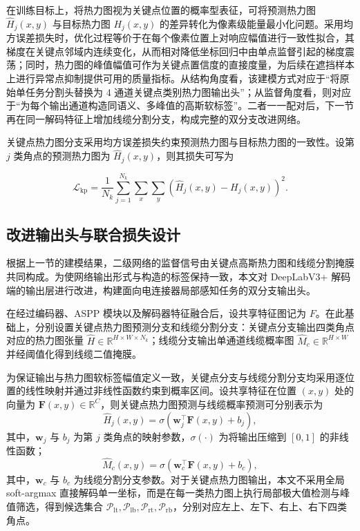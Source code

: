 在训练目标上，将热力图视为关键点位置的概率型表征，可将预测热力图 \(\hat{H}_j(x,y)\) 与目标热力图 \(H_j(x,y)\) 的差异转化为像素级能量最小化问题。采用均方误差损失时，优化过程等价于在每个像素位置上对响应幅值进行一致性拟合，其梯度在关键点邻域内连续变化，从而相对降低坐标回归中由单点监督引起的梯度震荡；同时，热力图的峰值幅值可作为关键点置信度的直接度量，为后续在遮挡样本上进行异常点抑制提供可用的质量指标。从结构角度看，该建模方式对应于“将原始单任务分割头替换为 4 通道关键点类别热力图输出头”；从监督角度看，则对应于“为每个输出通道构造同语义、多峰值的高斯软标签”。二者一一配对后，下一节再在同一解码特征上增加线缆分割分支，构成完整的双分支改进网络。

关键点热力图分支采用均方误差损失约束预测热力图与目标热力图的一致性。设第 \(j\) 类角点的预测热力图为 \(\hat{H}_j(x,y)\)，则其损失可写为

$$
\mathcal{L}_{\mathrm{kp}}=\frac{1}{N_k}\sum_{j=1}^{N_k}\sum_{x}\sum_{y}\left(\hat{H}_j(x,y)-H_j(x,y)\right)^2.
$$

\subsection{改进输出头与联合损失设计}
根据上一节的建模结果，二级网络的监督信号由关键点高斯热力图和线缆分割掩膜共同构成。为使网络输出形式与构造的标签保持一致，本文对 DeepLabV3+ 解码端的输出层进行改进，构建面向电连接器局部感知任务的双分支输出头。

在经过编码器、ASPP 模块以及解码器特征融合后，设共享特征图记为 \(F\)。在此基础上，分别设置关键点热力图预测分支和线缆分割分支：关键点分支输出四类角点对应的热力图张量 \(\hat{H}\in\mathbb{R}^{H\times W\times N_k}\)；线缆分支输出单通道线缆概率图 \(\hat{M}_{c}\in\mathbb{R}^{H\times W}\) 并经阈值化得到线缆二值掩膜。

为保证输出与热力图软标签幅值定义一致，关键点分支与线缆分割分支均采用逐位置的线性映射并通过非线性函数约束到概率区间。设共享特征在位置 \((x,y)\) 处的向量为 \(\mathbf{F}(x,y)\in\mathbb{R}^{C}\)，则关键点热力图预测与线缆概率预测可分别表示为
$$
\hat{H}_j(x,y)=\sigma\!\left(\mathbf{w}_j^\top \mathbf{F}(x,y)+b_j\right),
$$
其中，\(\mathbf{w}_j\) 与 \(b_j\) 为第 \(j\) 类角点的映射参数，\(\sigma(\cdot)\) 为将输出压缩到 \([0,1]\) 的非线性函数；
$$
\hat{M}_c(x,y)=\sigma\!\left(\mathbf{w}_c^\top \mathbf{F}(x,y)+b_c\right),
$$
其中，\(\mathbf{w}_c\) 与 \(b_c\) 为线缆分割分支参数。对于关键点热力图输出，本文不采用全局 soft-argmax 直接解码单一坐标，而是在每一类热力图上执行局部极大值检测与峰值筛选，得到候选集合 \(\mathcal{P}_{\mathrm{lt}},\mathcal{P}_{\mathrm{lb}},\mathcal{P}_{\mathrm{rt}},\mathcal{P}_{\mathrm{rb}}\)，分别对应左上、左下、右上、右下四类角点。

